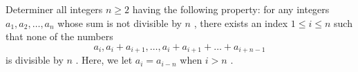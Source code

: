Determiner all integers 
$ n\geq 2$
 having the following property: for any integers 
$a_1,a_2,\ldots, a_n$
 whose sum is not divisible by 
$n$
,
 there exists an index 
$1 \leq i \leq n$
 such that none of the numbers 
$$a_i,a_i+a_{i+1},\ldots,a_i+a_{i+1}+\ldots+a_{i+n-1}$$
is divisible by 
$n$
.
 Here, we let 
$a_i=a_{i-n}$
 when 
$i  >n$
.
